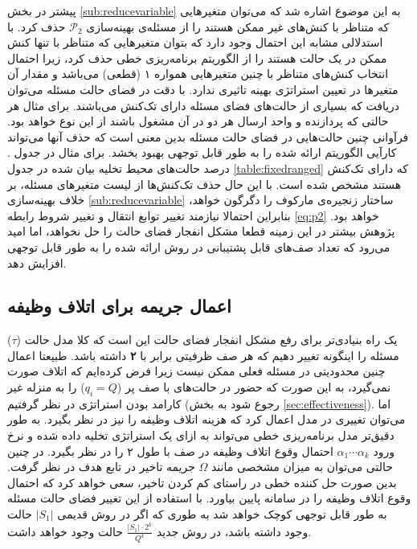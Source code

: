 پیشتر در بخش \ref{sub:reducevariable} به این موضوع اشاره شد که می‌توان متغیرهایی که متناظر با کنش‌های غیر ممکن هستند را از مسئله‌ی بهینه‌سازی 
 $\mathcal{P}_2$
 حذف کرد. با استدلالی مشابه این احتمال وجود دارد که بتوان متغیرهایی که متناظر با تنها کنش ممکن در یک حالت هستند را از الگوریتم برنامه‌ریزی خطی حذف کرد، زیرا احتمال انتخاب کنش‌های متناظر با چنین متغیرهایی همواره ۱ (قطعی) می‌باشد و مقدار آن متغیرها در تعیین استراتژی بهینه تاثیری ندارد. با دقت در فضای حالت مسئله می‌توان دریافت که بسیاری از حالت‌های فضای مسئله دارای تک‌کنش می‌باشند. برای مثال هر حالتی که پردازنده و واحد ارسال هر دو در آن مشغول باشند از این نوع خواهد بود. فرآوانی چنین حالت‌هایی در فضای حالت مسئله بدین معنی است که حذف آنها می‌تواند کارآیی الگوریتم ارائه شده را به طور قابل توجهی بهبود بخشد. برای مثال در جدول . درصد حالت‌های محیط تخلیه بیان شده در جدول \ref{table:fixedranged} که دارای تک‌کنش هستند مشخص شده است. با این حال حذف تک‌کنش‌ها از لیست متغیرهای مسئله، بر خلاف بهینه‌سازی \ref{sub:reducevariable} ساختار زنجیره‌ی مارکوف را دگرگون خواهد، بنابراین احتمالا نیازمند تغییر توابع انتقال و تغییر شروط رابطه \ref{eq:p2} خواهد بود. پژوهش بیشتر در این زمینه قطعا مشکل انفجار فضای حالت را حل نخواهد، اما امید می‌رود که تعداد صف‌های قابل پشتیبانی در روش ارائه شده را به طور قابل توجهی افزایش دهد.

\subsection{اعمال جریمه برای اتلاف وظیفه}
یک راه بنیادی‌تر برای رفع مشکل انفجار فضای حالت این است که کلا مدل حالت ($\tau$) مسئله را اینگونه تغییر دهیم که هر صف ظرفیتی برابر با \textbf{۲} داشته باشد. طبیعتا اعمال چنین محدودیتی در مسئله فعلی ممکن نیست زیرا فرض کرده‌ایم که اتلاف صورت نمی‌گیرد، به این صورت که حضور در حالت‌های با صف پر ($q_i = Q$) را به منزله غیر کارامد بودن استراتژی در نظر گرفتیم (رجوع شود به بخش \ref{sec:effectiveness}). اما می‌توان تغییری در مدل اعمال کرد که هزینه اتلاف وظیفه را نیز در نظر بگیرد. به طور دقیق‌تر مدل برنامه‌ریزی خطی می‌تواند به ازای یک استراتژی تخلیه داده شده و نرخ ورود $\alpha_1 \cdots \alpha_k$ احتمال وقوع اتلاف وظیفه در صف با طول ۲ را در نظر بگیرد. در چنین حالتی می‌توان به میزان مشخصی مانند $\Omega$ جریمه تاخیر در تابع هدف در نظر گرفت. بدین صورت حل کننده خطی در راستای کم کردن تاخیر، سعی خواهد کرد که احتمال وقوع اتلاف وظیفه را در سامانه پایین بیاورد. با استفاده از این تغییر فضای حالت مسئله به طور قابل توجهی کوچک خواهد شد به طوری که اگر در روش قدیمی $|S_1|$ حالت وجود داشته باشد، در روش جدید 
$\frac{|S_1| \cdot 2^k}{Q^k}$ 
حالت وجود خواهد داشت.
